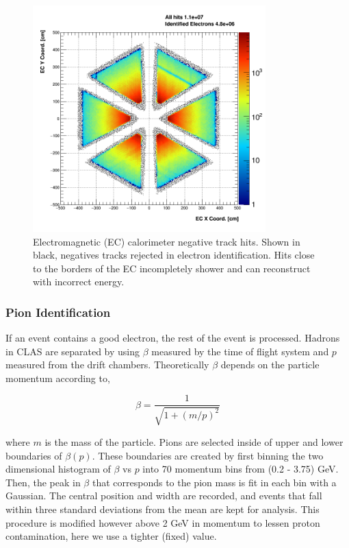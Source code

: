 \begin{figure}
  \centering
  \includegraphics[width=9cm]{image/ECFiducial.png}
  \caption{Electromagnetic (EC) calorimeter negative track hits.  Shown in black, negatives tracks rejected in electron identification.  Hits close to the borders of the EC incompletely shower and can reconstruct with incorrect energy.}
  \label{fig:ecfid}
\end{figure}

\subsubsection{Pion Identification}
If an event contains a good electron, the rest of the event is processed.  Hadrons in CLAS are separated by using $\beta$ measured by the time of flight system and $p$ measured from the drift chambers.  Theoretically $\beta$ depends on the particle momentum according to, 

\begin{equation}
	\beta = \frac{1}{\sqrt{1 + (m/p)^2}}
\end{equation}

where $m$ is the mass of the particle.  Pions are selected inside of upper and lower boundaries of $\beta(p)$.  These boundaries are created by first binning the two dimensional histogram of $\beta$ vs $p$ into 70 momentum bins from (0.2 - 3.75) GeV.  Then, the peak in $\beta$ that corresponds to the pion mass is fit in each bin with a Gaussian.  The central position and width are recorded, and events that fall within three standard deviations from the mean are kept for analysis.  This procedure is modified however above 2 GeV in momentum to lessen proton contamination, here we use a tighter (fixed) value.    

